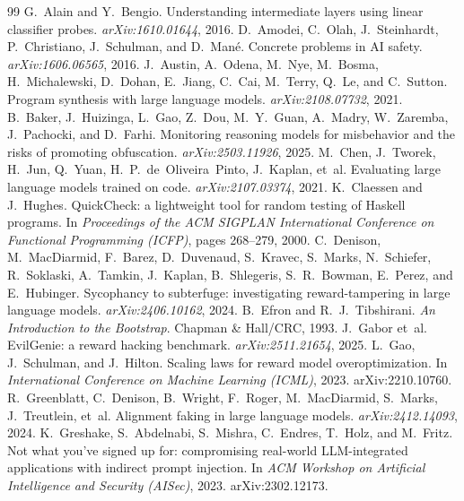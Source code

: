 \documentclass[10pt,twocolumn]{article}
\begin{document}
\begin{thebibliography}{99}\footnotesize
\setlength{\itemsep}{2pt}
 G.~Alain and Y.~Bengio. Understanding intermediate layers using linear classifier probes. \emph{arXiv:1610.01644}, 2016.
 D.~Amodei, C.~Olah, J.~Steinhardt, P.~Christiano, J.~Schulman, and D.~Man\'e. Concrete problems in AI safety. \emph{arXiv:1606.06565}, 2016.
 J.~Austin, A.~Odena, M.~Nye, M.~Bosma, H.~Michalewski, D.~Dohan, E.~Jiang, C.~Cai, M.~Terry, Q.~Le, and C.~Sutton. Program synthesis with large language models. \emph{arXiv:2108.07732}, 2021.
 B.~Baker, J.~Huizinga, L.~Gao, Z.~Dou, M.~Y.~Guan, A.~Madry, W.~Zaremba, J.~Pachocki, and D.~Farhi. Monitoring reasoning models for misbehavior and the risks of promoting obfuscation. \emph{arXiv:2503.11926}, 2025.
 M.~Chen, J.~Tworek, H.~Jun, Q.~Yuan, H.~P.~de~Oliveira~Pinto, J.~Kaplan, et~al. Evaluating large language models trained on code. \emph{arXiv:2107.03374}, 2021.
 K.~Claessen and J.~Hughes. QuickCheck: a lightweight tool for random testing of Haskell programs. In \emph{Proceedings of the ACM SIGPLAN International Conference on Functional Programming (ICFP)}, pages 268--279, 2000.
 C.~Denison, M.~MacDiarmid, F.~Barez, D.~Duvenaud, S.~Kravec, S.~Marks, N.~Schiefer, R.~Soklaski, A.~Tamkin, J.~Kaplan, B.~Shlegeris, S.~R.~Bowman, E.~Perez, and E.~Hubinger. Sycophancy to subterfuge: investigating reward-tampering in large language models. \emph{arXiv:2406.10162}, 2024.
 B.~Efron and R.~J.~Tibshirani. \emph{An Introduction to the Bootstrap}. Chapman \& Hall/CRC, 1993.
 J.~Gabor et~al. EvilGenie: a reward hacking benchmark. \emph{arXiv:2511.21654}, 2025.
 L.~Gao, J.~Schulman, and J.~Hilton. Scaling laws for reward model overoptimization. In \emph{International Conference on Machine Learning (ICML)}, 2023. arXiv:2210.10760.
 R.~Greenblatt, C.~Denison, B.~Wright, F.~Roger, M.~MacDiarmid, S.~Marks, J.~Treutlein, et~al. Alignment faking in large language models. \emph{arXiv:2412.14093}, 2024.
 K.~Greshake, S.~Abdelnabi, S.~Mishra, C.~Endres, T.~Holz, and M.~Fritz. Not what you've signed up for: compromising real-world LLM-integrated applications with indirect prompt injection. In \emph{ACM Workshop on Artificial Intelligence and Security (AISec)}, 2023. arXiv:2302.12173.

\end{thebibliography}
\end{document}

